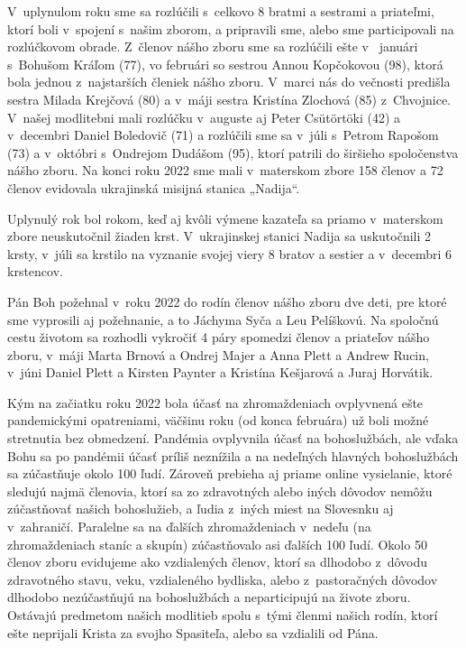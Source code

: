 V~uplynulom roku sme sa rozlúčili s~celkovo 8 bratmi a sestrami a priateľmi, ktorí boli v~spojení s~našim zborom, a pripravili sme, alebo sme participovali na rozlúčkovom obrade. Z~členov nášho zboru sme sa rozlúčili ešte v~ januári s~Bohušom Kráľom (77), vo februári so sestrou Annou Kopčokovou (98), ktorá bola jednou z~najstarších členiek nášho zboru. V~marci nás do večnosti predišla sestra Milada Krejčová (80) a v~máji sestra Kristína Zlochová (85) z~Chvojnice. V~našej modlitebni mali rozlúčku v~auguste aj Peter Csütörtöki (42) a v~decembri Daniel Boledovič (71) a rozlúčili sme sa v~júli s~Petrom Rapošom (73) a v~októbri s~Ondrejom Dudášom (95), ktorí patrili do širšieho spoločenstva nášho zboru. Na konci roku 2022 sme mali v~materskom zbore 158 členov a 72 členov evidovala ukrajinská misijná stanica „Nadija“.

Uplynulý rok bol rokom, keď aj kvôli výmene kazateľa sa priamo v~materskom zbore neuskutočnil žiaden krst. V~ukrajinskej stanici Nadija sa uskutočnili 2 krsty, v~júli sa krstilo na vyznanie svojej viery 8 bratov a sestier a v~decembri 6 krstencov.

Pán Boh požehnal v~roku 2022 do rodín členov nášho zboru dve deti, pre ktoré sme vyprosili aj požehnanie, a to Jáchyma Syča a Leu Pelíškovú.
Na spoločnú cestu životom sa rozhodli vykročiť 4 páry spomedzi členov a priateľov nášho zboru, v~máji Marta Brnová a Ondrej Majer a Anna Plett a Andrew Rucin, v~júni Daniel Plett a Kirsten Paynter a Kristína Kešjarová a Juraj Horvátik.

Kým na začiatku roku 2022 bola účasť na zhromaždeniach ovplyvnená ešte pandemickými opatreniami, väčšinu roku (od konca februára) už boli možné stretnutia bez obmedzení. Pandémia ovplyvnila účasť na bohoslužbách, ale vďaka Bohu sa po pandémii účasť príliš neznížila a na nedeľných hlavných bohoslužbách sa zúčastňuje okolo 100 ľudí. Zároveň prebieha aj priame online vysielanie, ktoré sledujú najmä členovia, ktorí sa zo zdravotných alebo iných dôvodov nemôžu zúčastňovať našich bohoslužieb, a ľudia z~iných miest na Slovesnku aj v~zahraničí. Paralelne sa na ďalších zhromaždeniach v~nedeľu (na zhromaždeniach staníc a skupín) zúčastňovalo asi ďalších 100 ľudí. Okolo 50 členov zboru evidujeme ako vzdialených členov, ktorí sa dlhodobo z~dôvodu zdravotného stavu, veku, vzdialeného bydliska, alebo z~pastoračných dôvodov dlhodobo nezúčastňujú na bohoslužbách a neparticipujú na živote zboru. Ostávajú predmetom našich modlitieb spolu s~tými členmi našich rodín, ktorí ešte neprijali Krista za svojho Spasiteľa, alebo sa vzdialili od Pána.

